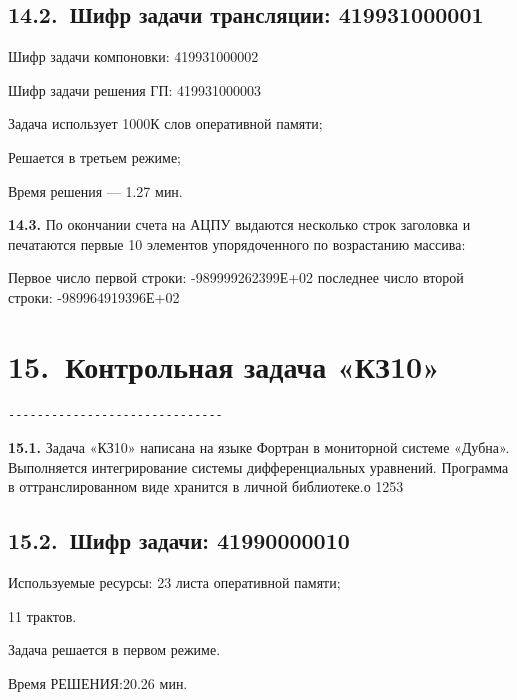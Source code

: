 \documentclass[11pt,a4paper]{article}
\begin{document}
\subsection*{14.2.~Шифр задачи трансляции: 419931000001}
\begin{center}Шифр задачи компоновки: 419931000002\end{center}
\begin{center}Шифр задачи решения ГП: 419931000003\end{center}
Задача использует 1000К слов оперативной памяти;

Решается в третьем режиме;

Время решения --- 1.27 мин.

\par\textbf{14.3.} По окончании счета на АЦПУ выдаются несколько строк заголовка и печатаются первые 10 элементов упорядоченного по возрастанию массива:\par
Первое число первой строки: -989999262399Е+02 последнее число второй строки: -989964919396Е+02

\section*{15.~Контрольная задача «КЗ10»}
\begin{center}\small
\begin{BVerbatim}
------------------------------
\end{BVerbatim}
\end{center}

\par\textbf{15.1.} Задача «КЗ10» написана на языке Фортран в мониторной системе «Дубна». Выполняется интегрирование системы дифференциальных уравнений. Программа в оттранслированном виде хранится в личной библиотеке.о 1253\par
\subsection*{15.2.~Шифр задачи: 41990000010}
Используемые ресурсы: 23 листа оперативной памяти;

11 трактов.

Задача решается в первом режиме.

Время РЕШЕНИЯ:20.26 мин.
\end{document}
